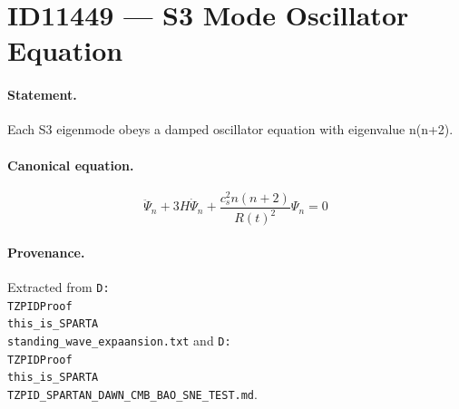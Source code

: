 \section*{ID11449 --- S3 Mode Oscillator Equation}

\paragraph{Statement.}
Each S3 eigenmode obeys a damped oscillator equation with eigenvalue n(n+2).

\paragraph{Canonical equation.}
\[
\ddot\Psi_n+3H\dot\Psi_n+\frac{c_s^2n(n+2)}{R(t)^2}\Psi_n=0
\]

\paragraph{Provenance.}
Extracted from \texttt{D:\\TZPIDProof\\this\_is\_SPARTA\\standing\_wave\_expaansion.txt} and \texttt{D:\\TZPIDProof\\this\_is\_SPARTA\\TZPID\_SPARTAN\_DAWN\_CMB\_BAO\_SNE\_TEST.md}.
